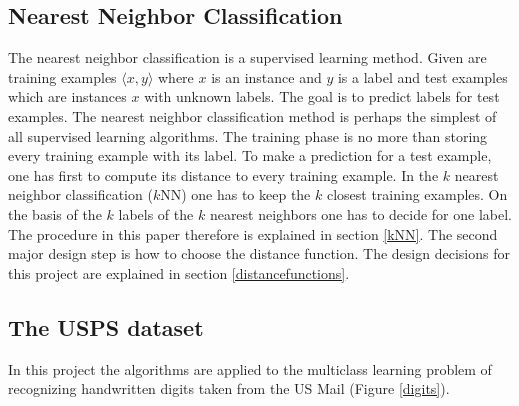 \documentclass[10pt,twocolumn,letterpaper]{article}
\begin{document}
\subsection{Nearest Neighbor Classification}
The nearest neighbor classification is a supervised learning method. Given are training examples $\langle x,y \rangle$ where $x$ is an instance and $y$ is a label and test examples which are instances $x$ with unknown labels. The goal is to predict labels for test examples. The nearest neighbor classification method is perhaps the simplest of all supervised learning algorithms. The training phase is no more than storing every training example with its label. To make a prediction for a test example, one has first to compute its distance to every training example. In the $k$ nearest neighbor classification ($k$NN) one has to keep the $k$ closest training examples. On the basis of the $k$ labels of the $k$ nearest neighbors one has to decide for one label. The procedure in this paper therefore is explained in section \ref{kNN}. The second major design step is how to choose the distance function. The design decisions for this project are explained in section \ref{distancefunctions}.
 

\subsection{The USPS dataset}
In this project the algorithms are applied to the multiclass learning problem of recognizing handwritten digits taken from the US Mail (Figure \ref{digits}).
\end{document}
